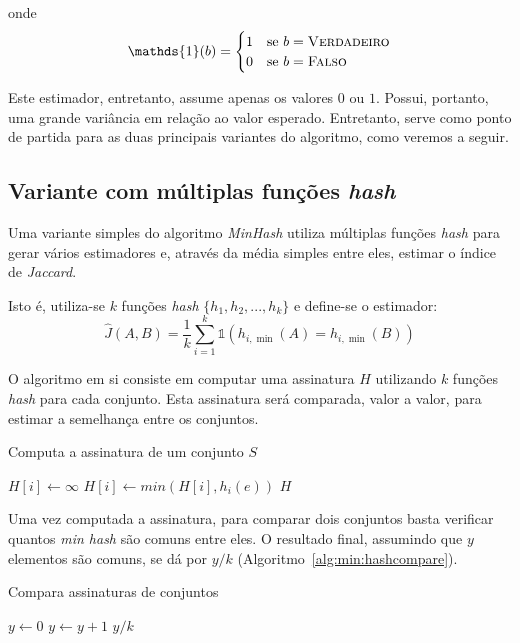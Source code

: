 onde
\[
\mathds{1}(b) = \begin{cases} 
    1 & \text{se}\ b = \textsc{Verdadeiro} \\
    0 & \text{se}\ b = \textsc{Falso} \\
\end{cases}
\]

Este estimador, entretanto, assume apenas os valores $0$ ou $1$. Possui, portanto, uma grande variância em relação ao valor esperado. Entretanto, serve como ponto de partida para as duas principais variantes do algoritmo, como veremos a seguir.

\subsection{Variante com múltiplas funções \emph{hash}}

Uma variante simples do algoritmo \emph{MinHash} utiliza múltiplas funções \emph{hash} para gerar vários estimadores e, através da média simples entre eles, estimar o índice de \emph{Jaccard}. 

Isto é, utiliza-se $k$ funções \emph{hash} $\{h_1, h_2, ... ,h_k\}$ e define-se o estimador:
\[
\hat{J}(A, B) = \frac{1}{k} \sum\limits_{i=1}^{k} \mathds{1}(h_{i,\min}(A) = h_{i,\min}(B))
\]

O algoritmo em si consiste em computar uma assinatura $H$ utilizando $k$ funções \emph{hash} para cada conjunto. Esta assinatura será comparada, valor a valor, para estimar a semelhança entre os conjuntos.

\begin{algorithm}
\linespread{1}\selectfont
\caption{Computa a assinatura de um conjunto $S$}
\label{alg:min:hashcompute}
\begin{algorithmic}[1]
        \State $H[i] \gets \infty$
            \State $H[i] \gets min(H[i], h_i(e))$
	    \EndFor
	\EndFor
	\Return $H$
\EndFunction
\end{algorithmic}
\end{algorithm}

Uma vez computada a assinatura, para comparar dois conjuntos basta verificar quantos \emph{min hash} são comuns entre eles. O resultado final, assumindo que $y$ elementos são comuns, se dá por $y/k$ (Algoritmo~\ref{alg:min:hashcompare}).

\begin{algorithm}
\linespread{1}\selectfont
\caption{Compara assinaturas de conjuntos}
\label{alg:min:hashcompare}
\begin{algorithmic}[1]
    \State $y \gets 0$
            \State $y \gets y + 1$
        \EndIf
	\EndFor
	\Return $y/k$
\EndFunction
\end{algorithmic}
\end{algorithm}

